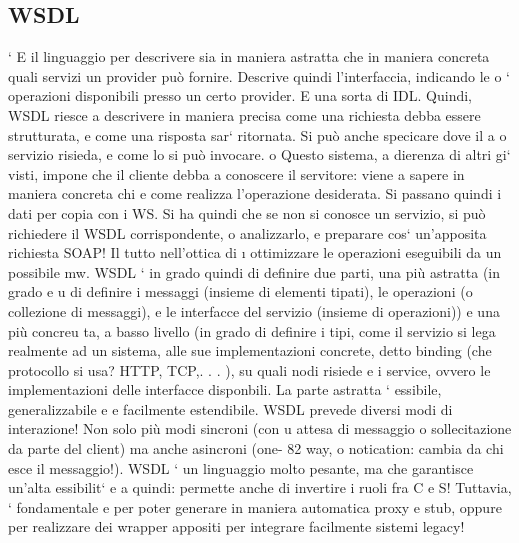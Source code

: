 \documentclass[a4paper,12pt]{article}
\begin{document}
\subsection{WSDL}
`
E il linguaggio per descrivere sia in maniera astratta che in maniera concreta
quali servizi un provider può fornire. Descrive quindi l'interfaccia, indicando le
o
`
operazioni disponibili presso un certo provider. E una sorta di IDL. Quindi,
WSDL riesce a descrivere in maniera precisa come una richiesta debba essere
strutturata, e come una risposta sar` ritornata. Si può anche specicare dove il
a
o
servizio risieda, e come lo si può invocare.
o
Questo sistema, a dierenza di altri gi` visti, impone che il cliente debba
a
conoscere il servitore: viene a sapere in maniera concreta chi e come realizza
l'operazione desiderata. Si passano quindi i dati per copia con i WS. Si ha quindi che se non si conosce un servizio, si
può richiedere il WSDL corrispondente,
o
analizzarlo, e preparare cos` un'apposita richiesta SOAP! Il tutto nell'ottica di
\i{}
ottimizzare le operazioni eseguibili da un possibile mw.
WSDL ` in grado quindi di definire due parti, una più astratta (in grado
e
u
di definire i messaggi (insieme di elementi tipati), le operazioni (o collezione di
messaggi), e le interfacce del servizio (insieme di operazioni)) e una più concreu
ta, a basso livello (in grado di definire i tipi, come il servizio si lega realmente
ad un sistema, alle sue implementazioni concrete, detto binding (che protocollo
si usa? HTTP, TCP,. . . ), su quali nodi risiede e i service, ovvero le implementazioni delle interfacce disponbili. La
parte astratta ` essibile, generalizzabile
e
e facilmente estendibile.
WSDL prevede diversi modi di interazione! Non solo più modi sincroni (con
u
attesa di messaggio o sollecitazione da parte del client) ma anche asincroni (one-
82
way, o notication: cambia da chi esce il messaggio!).
WSDL ` un linguaggio molto pesante, ma che garantisce un'alta essibilit`
e
a
quindi: permette anche di invertire i ruoli fra C e S! Tuttavia, ` fondamentale
e
per poter generare in maniera automatica proxy e stub, oppure per realizzare
dei wrapper appositi per integrare facilmente sistemi legacy!
\end{document}
